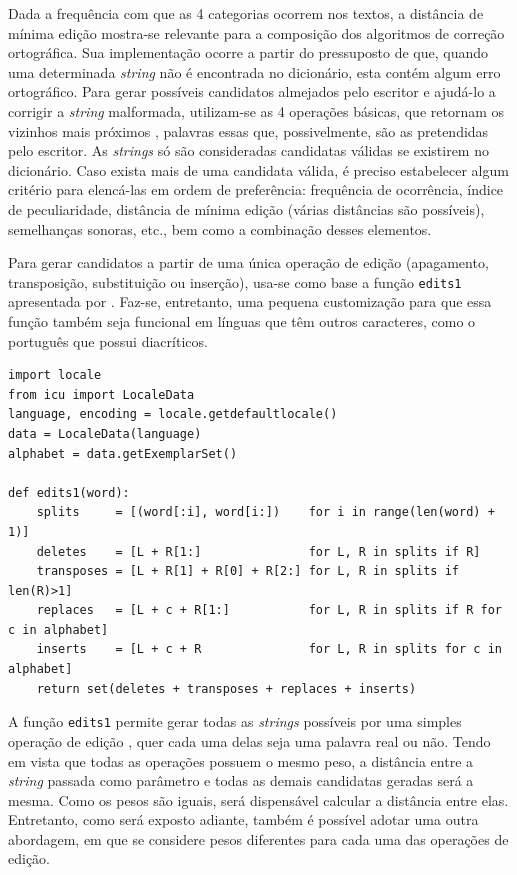 \documentclass{textolivre}
\begin{document}
Dada a frequência com que as 4 categorias ocorrem nos textos, a
distância de mínima edição mostra-se relevante para a composição dos
algoritmos de correção ortográfica. Sua implementação ocorre a partir do
pressuposto de que, quando uma determinada \textit{string} não é encontrada 
no dicionário, esta contém algum erro ortográfico.
Para gerar possíveis candidatos almejados pelo escritor e ajudá-lo a corrigir a \textit{string}
malformada, utilizam-se as 4 operações básicas,
que retornam os vizinhos mais próximos \cite{damerau1964}, palavras
essas que, possivelmente, são as pretendidas pelo escritor.
As \textit{strings} só são consideradas
candidatas válidas se existirem no dicionário.
Caso exista mais de uma candidata válida, é preciso estabelecer algum
critério para elencá-las em ordem de preferência: frequência de ocorrência, 
índice de peculiaridade, distância de mínima edição (várias distâncias são possíveis), semelhanças sonoras, etc.,
bem como a combinação desses elementos. 

Para gerar candidatos a partir de uma única operação de edição (apagamento, transposição, substituição ou inserção),
usa-se como base a função \texttt{edits1} apresentada por \textcite{norvig2007}. Faz-se, entretanto,
uma pequena customização para que essa função também seja funcional em línguas que têm outros caracteres, como o
português que possui diacríticos.
\begin{lstlisting}[label=lst-list-edits]
import locale
from icu import LocaleData
language, encoding = locale.getdefaultlocale()
data = LocaleData(language)
alphabet = data.getExemplarSet()

def edits1(word):
    splits     = [(word[:i], word[i:])    for i in range(len(word) + 1)]
    deletes    = [L + R[1:]               for L, R in splits if R]
    transposes = [L + R[1] + R[0] + R[2:] for L, R in splits if len(R)>1]
    replaces   = [L + c + R[1:]           for L, R in splits if R for c in alphabet]
    inserts    = [L + c + R               for L, R in splits for c in alphabet]
    return set(deletes + transposes + replaces + inserts)
\end{lstlisting}%

A função \texttt{edits1} permite
gerar todas as \textit{strings}
possíveis por uma simples operação de edição \cite{damerau1964}, quer cada uma delas seja uma palavra real ou não. 
Tendo em vista que todas as operações
possuem o mesmo peso,
a distância entre a \textit{string} passada como parâmetro e todas as demais candidatas geradas será a mesma.
Como os pesos são iguais, será dispensável calcular a distância entre elas. Entretanto, como será exposto adiante, também é possível
adotar uma outra
abordagem, em que se 
considere pesos
diferentes para cada uma das operações de edição. 
\end{document}

